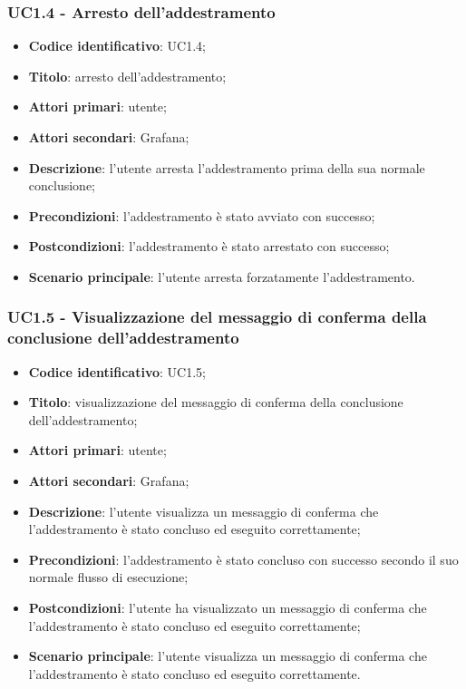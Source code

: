 \subsubsection{UC1.4 - Arresto dell'addestramento}
\begin{itemize}
	\item \textbf{Codice identificativo}: UC1.4;
	\item \textbf{Titolo}: arresto dell'addestramento;
	\item \textbf{Attori primari}: utente;
	\item \textbf{Attori secondari}: Grafana\glo;
	\item \textbf{Descrizione}: l'utente arresta l'addestramento prima della sua normale conclusione;
	\item \textbf{Precondizioni}: l'addestramento è stato avviato con successo;
	\item \textbf{Postcondizioni}: l'addestramento è stato arrestato con successo;
	\item \textbf{Scenario principale}: l'utente arresta forzatamente l'addestramento.
\end{itemize}

\subsubsection{UC1.5 - Visualizzazione del messaggio di conferma della conclusione dell'addestramento}
\begin{itemize}
	\item \textbf{Codice identificativo}: UC1.5;
	\item \textbf{Titolo}: visualizzazione del messaggio di conferma della conclusione dell'addestramento;
	\item \textbf{Attori primari}: utente;
	\item \textbf{Attori secondari}: Grafana\glo;
	\item \textbf{Descrizione}: l'utente visualizza un messaggio di conferma che l'addestramento è stato concluso ed eseguito correttamente;
	\item \textbf{Precondizioni}: l'addestramento è stato concluso con successo secondo il suo normale flusso di esecuzione;
	\item \textbf{Postcondizioni}: l'utente ha visualizzato un messaggio di conferma che l'addestramento è stato concluso ed eseguito correttamente;
	\item \textbf{Scenario principale}: l'utente visualizza un messaggio di conferma che l'addestramento è stato concluso ed eseguito correttamente.
\end{itemize}
